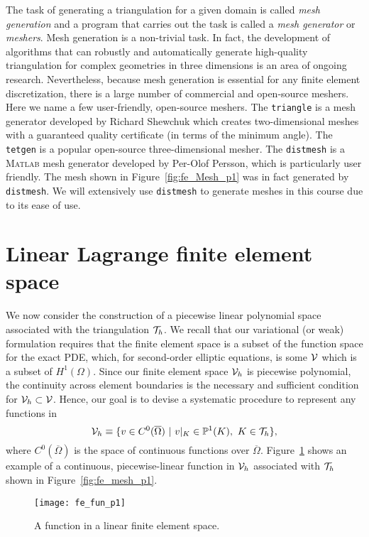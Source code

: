 The task of generating a triangulation for a given domain is called \emph{mesh generation} and a program that carries out the task is called a \emph{mesh generator} or \emph{meshers}.  Mesh generation is a non-trivial task.  In fact, the development of algorithms that can robustly and automatically generate high-quality triangulation for complex geometries in three dimensions is an area of ongoing research.  Nevertheless, because mesh generation is essential for any finite element discretization, there is a large number of commercial and open-source meshers.  Here we name a few user-friendly, open-source meshers. The \texttt{triangle} is a mesh generator developed by Richard Shewchuk which creates two-dimensional meshes with a guaranteed quality certificate (in terms of the minimum angle). The \texttt{tetgen} is a popular open-source three-dimensional mesher.  The \texttt{distmesh} is a \textsc{Matlab} mesh generator developed by Per-Olof Persson, which is particularly user friendly.  The mesh shown in Figure~\ref{fig:fe_Mesh_p1} was in fact generated by \texttt{distmesh}.  We will extensively use \texttt{distmesh} to generate meshes in this course due to its ease of use.

\section{Linear Lagrange finite element space}
\label{sec:fe_lin_tri}
We now consider the construction of a piecewise linear polynomial space associated with the triangulation $\mathcal{T}_h$. We recall that our variational (or weak) formulation requires that the finite element space is a subset of the function space for the exact PDE, which, for second-order elliptic equations, is some $\mathcal{V}$ which is a subset of $H^1(\Omega)$. Since our finite element space $\mathcal{V}_h$ is piecewise polynomial, the continuity across element boundaries is the necessary and sufficient condition for $\mathcal{V}_h \subset \mathcal{V}$.  Hence, our goal is to devise a systematic procedure to represent any functions in
\begin{equation}
  \mathcal{V}_h \equiv \{ v \in C^0(\overline \Omega) \ | \ v|_K \in \mathbb{P}^1(K), \ K \in \mathcal{T}_h \},
  \label{eq:fe_lin_Vh}
\end{equation}
where $C^0(\overline \Omega)$ is the space of continuous functions over $\overline \Omega$.  Figure~\ref{fig:fe_fun_p1} shows an example of a continuous, piecewise-linear function in $\mathcal{V}_h$ associated with $\mathcal{T}_h$ shown in Figure~\ref{fig:fe_mesh_p1}.
\begin{figure}
  \centering
  \texttt{[image: fe\_fun\_p1]}
  \caption{A function in a linear finite element space.}
  \label{fig:fe_fun_p1}
\end{figure}

